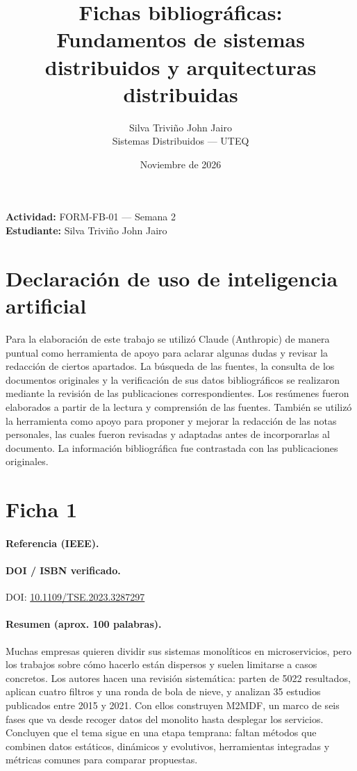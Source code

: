 \documentclass[12pt,a4paper]{article}
\title{Fichas bibliográficas:\\Fundamentos de sistemas distribuidos y arquitecturas distribuidas}
\author{Silva Triviño John Jairo\\Sistemas Distribuidos --- UTEQ}
\date{Noviembre de 2026}
\begin{document}
\maketitle

\textbf{Actividad:} FORM-FB-01 --- Semana 2\\
\textbf{Estudiante:} Silva Triviño John Jairo

\section*{Declaración de uso de inteligencia artificial}

Para la elaboración de este trabajo se utilizó Claude (Anthropic) de manera puntual como herramienta de apoyo para aclarar algunas dudas y revisar la redacción de ciertos apartados. La búsqueda de las fuentes, la consulta de los documentos originales y la verificación de sus datos bibliográficos se realizaron mediante la revisión de las publicaciones correspondientes. Los resúmenes fueron elaborados a partir de la lectura y comprensión de las fuentes. También se utilizó la herramienta como apoyo para proponer y mejorar la redacción de las notas personales, las cuales fueron revisadas y adaptadas antes de incorporarlas al documento. La información bibliográfica fue contrastada con las publicaciones originales.

\clearpage

\section{Ficha 1}

\paragraph{Referencia (IEEE).}

\paragraph{DOI / ISBN verificado.}
DOI: \href{https://doi.org/10.1109/TSE.2023.3287297}{10.1109/TSE.2023.3287297}

\paragraph{Resumen (aprox. 100 palabras).}
Muchas empresas quieren dividir sus sistemas monolíticos en microservicios, pero los trabajos sobre cómo hacerlo están dispersos y suelen limitarse a casos concretos. Los autores hacen una revisión sistemática: parten de 5022 resultados, aplican cuatro filtros y una ronda de bola de nieve, y analizan 35 estudios publicados entre 2015 y 2021. Con ellos construyen M2MDF, un marco de seis fases que va desde recoger datos del monolito hasta desplegar los servicios. Concluyen que el tema sigue en una etapa temprana: faltan métodos que combinen datos estáticos, dinámicos y evolutivos, herramientas integradas y métricas comunes para comparar propuestas.
\end{document}

